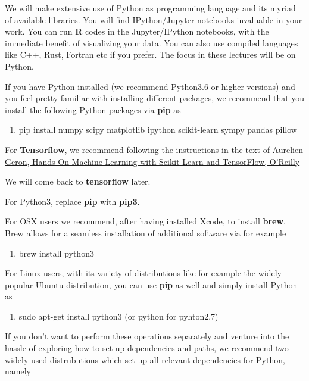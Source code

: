 \documentclass[%
oneside,                 %
final,                   %
10pt]{article}
\begin{document}
\noindent
We will make extensive use of Python as programming language and its
myriad of available libraries.  You will find
IPython/Jupyter notebooks invaluable in your work.  You can run \textbf{R}
codes in the Jupyter/IPython notebooks, with the immediate benefit of
visualizing your data. You can also use compiled languages like C++,
Rust, Fortran etc if you prefer. The focus in these lectures will be
on Python.

If you have Python installed (we recommend Python3.6 or higher versions) and you feel
pretty familiar with installing different packages, we recommend that
you install the following Python packages via \textbf{pip} as 

\begin{enumerate}
\item pip install numpy scipy matplotlib ipython scikit-learn sympy pandas pillow 
\end{enumerate}

\noindent
For \textbf{Tensorflow}, we recommend following the instructions in the text of 
\href{{http://shop.oreilly.com/product/0636920052289.do}}{Aurelien Geron, Hands‑On Machine Learning with Scikit‑Learn and TensorFlow, O'Reilly}

We will come back to \textbf{tensorflow} later. 

For Python3, replace \textbf{pip} with \textbf{pip3}.

For OSX users we recommend, after having installed Xcode, to
install \textbf{brew}. Brew allows for a seamless installation of additional
software via for example 

\begin{enumerate}
\item brew install python3
\end{enumerate}

\noindent
For Linux users, with its variety of distributions like for example the widely popular Ubuntu distribution,
you can use \textbf{pip} as well and simply install Python as 

\begin{enumerate}
\item sudo apt-get install python3  (or python for pyhton2.7)
\end{enumerate}

\noindent
If you don't want to perform these operations separately and venture
into the hassle of exploring how to set up dependencies and paths, we
recommend two widely used distrubutions which set up all relevant
dependencies for Python, namely 
\end{document}
